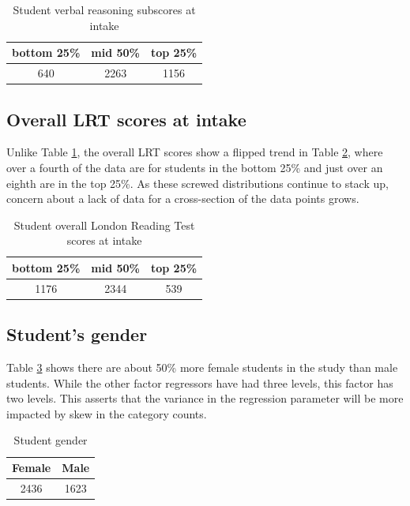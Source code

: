 \documentclass{article}
\begin{document}
\begin{table}[H]
\centering
\caption{Student verbal reasoning subscores at intake}
\label{tab2}
\begin{tabular}{@{}  c c c@{}}
\textbf{bottom 25\%} & \textbf{mid 50\%} & \textbf{top 25\%} \\\midrule
640     &  2263     &  1156 \\
\bottomrule
\hline
\end{tabular}
\end{table}

\subsection{Overall LRT scores at intake}
Unlike Table \ref{tab2}, the overall LRT scores show a flipped trend in Table \ref{tab3}, where over a fourth of the data are for students in the bottom 25\% and just over an eighth are in the top 25\%. As these screwed distributions continue to stack up, concern about a lack of data for a cross-section of the data points grows.

\begin{table}[H]
\centering
\caption{Student overall London Reading Test scores at intake}
\label{tab3}
\begin{tabular}{@{}  c c c@{}}
\textbf{bottom 25\%} & \textbf{mid 50\%} & \textbf{top 25\%} \\\midrule
      1176   &    2344     &   539 \\
\bottomrule
\hline
\end{tabular}
\end{table}


\subsection{Student's gender}
Table \ref{tab4} shows there are about 50\% more female students in the study than male students. While the other factor regressors have had three levels, this factor has two levels. This asserts that the variance in the regression parameter will be more impacted by skew in the category counts.

\begin{table}[H]
\centering
\caption{Student gender}
\label{tab4}
\begin{tabular}{@{}  c c @{}}
\textbf{Female} & \textbf{Male} \\\midrule
2436 & 1623\\
\bottomrule
\hline
\end{tabular}
\end{table}
\end{document}
